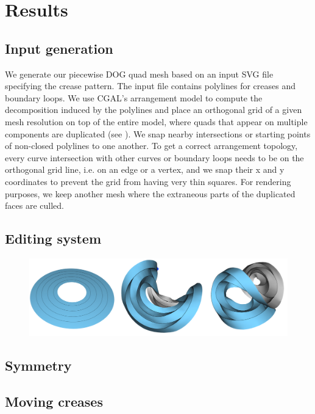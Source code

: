 \section{Results} \label{sec:results}
\subsection{Input generation}
We generate our piecewise DOG quad mesh based on an input SVG file specifying the crease pattern. The input file contains polylines for creases and boundary loops. We use CGAL's arrangement model \cite{cgal} to compute the decomposition induced by the polylines and place an orthogonal grid of a given mesh resolution on top of the entire model, where quads that appear on multiple components are duplicated (see ). We snap nearby intersections or starting points of non-closed polylines to one another. To get a correct arrangement topology, every curve intersection with other curves or boundary loops needs to be on the orthogonal grid line, i.e. on an edge or a vertex, and we snap their x and y coordinates to prevent the grid from having very thin squares. For rendering purposes, we keep another mesh where the extraneous parts of the duplicated faces are culled.
\subsection{Editing system}
\begin{figure} [h]
	\centering
	\includegraphics[width=\linewidth]{figures/annulus}
	\caption{ }
	\label{fig:annulus}
\end{figure}
\subsection{Symmetry}
\subsection{Moving creases}